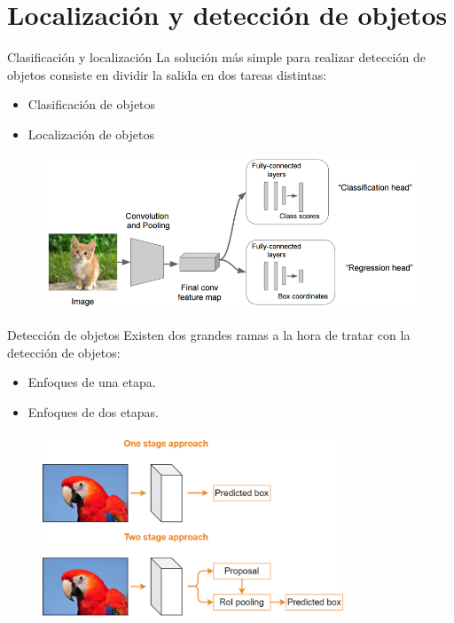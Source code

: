 \section{Localización y detección de objetos}

\begin{frame}{Clasificación y localización}
La \alert{solución más simple} para realizar detección de objetos consiste en dividir la salida en \alert{dos tareas distintas}:
\begin{itemize}
    \item Clasificación de objetos
    \item Localización de objetos
\end{itemize}

\begin{figure}
    \centering
    \includegraphics[width=\textwidth]{Slides/figures/Tema 4/ClasificationLocalization.png}
    \caption{\cite{ClaLocal}}
\end{figure}
\end{frame}

\begin{frame}{Detección de objetos}
Existen dos grandes ramas a la hora de tratar con la \alert{detección de objetos}:
\begin{itemize}
    \item \alert{Enfoques de una etapa}.
    \item \alert{Enfoques de dos etapas}.
\end{itemize}

\begin{figure}
    \centering
    \includegraphics[width=0.8\textwidth]{Slides/figures/Tema 4/StageApproaches.png}
\end{figure}
\end{frame}

